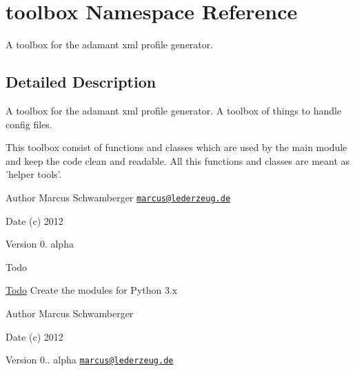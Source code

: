 \hypertarget{namespacetoolbox}{\section{toolbox Namespace Reference}
\label{namespacetoolbox}
}


A toolbox for the adamant xml profile generator.  




\subsection{Detailed Description}
A toolbox for the adamant xml profile generator. A toolbox of things to handle config files.

This toolbox consist of functions and classes which are used by the main module and keep the code clean and readable. All this functions and classes are meant as 'helper tools'.

\begin{DoxyAuthor}{Author}
Marcus Schwamberger  \href{mailto:marcus@lederzeug.de}{\tt marcus@lederzeug.\-de} 
\end{DoxyAuthor}
\begin{DoxyDate}{Date}
(c) 2012 
\end{DoxyDate}
\begin{DoxyVersion}{Version}
0. alpha
\end{DoxyVersion}
\begin{DoxyRefDesc}{Todo}
\item[\hyperlink{todo__todo000034}{Todo}]Create the modules for Python 3.\-x \end{DoxyRefDesc}


\begin{DoxyAuthor}{Author}
Marcus Schwamberger 
\end{DoxyAuthor}
\begin{DoxyDate}{Date}
(c) 2012 
\end{DoxyDate}
\begin{DoxyVersion}{Version}
0.. alpha  \href{mailto:marcus@lederzeug.de}{\tt marcus@lederzeug.\-de} 
\end{DoxyVersion}
